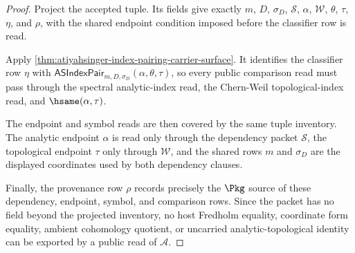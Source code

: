 \begin{proof}
Project the accepted tuple. Its fields give exactly $m$, $D$, $\sigma_D$,
$\mathcal{S}$, $\alpha$, $\mathcal{W}$, $\theta$, $\tau$, $\eta$, and $\rho$,
with the shared endpoint condition imposed before the classifier row is read.

Apply \autoref{thm:atiyahsinger-index-pairing-carrier-surface}. It identifies
the classifier row $\eta$ with
$\mathsf{ASIndexPair}_{m,D,\sigma_D}(\alpha,\theta,\tau)$, so every public
comparison read must pass through the spectral analytic-index read, the
Chern-Weil topological-index read, and $\hsame(\alpha,\tau)$.

The endpoint and symbol reads are then covered by the same tuple inventory.
The analytic endpoint $\alpha$ is read only through the dependency packet
$\mathcal{S}$, the topological endpoint $\tau$ only through $\mathcal{W}$, and
the shared rows $m$ and $\sigma_D$ are the displayed coordinates used by both
dependency clauses.

Finally, the provenance row $\rho$ records precisely the $\Pkg$ source of these
dependency, endpoint, symbol, and comparison rows. Since the packet has no
field beyond the projected inventory, no host Fredholm equality, coordinate
form equality, ambient cohomology quotient, or uncarried analytic-topological
identity can be exported by a public read of $\mathcal{A}$.
\end{proof}

